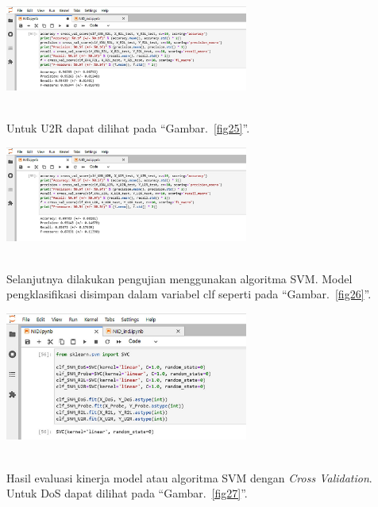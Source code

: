 \documentclass[conference]{IEEEtran}
\begin{document}
\begin{minipage}{\linewidth}
\centerline{\includegraphics[width=80mm]{Gambar/Gbr23.jpg}}
\label{fig24}
\end{minipage}\\

\noindent Untuk U2R dapat dilihat pada ``Gambar.~\ref{fig25}''.\\

\begin{minipage}{\linewidth}
\centerline{\includegraphics[width=80mm]{Gambar/Gbr24.jpg}}
\label{fig25}
\end{minipage}\\

Selanjutnya dilakukan pengujian menggunakan algoritma SVM. Model pengklasifikasi disimpan dalam variabel clf seperti pada ``Gambar.~\ref{fig26}''.\\

\begin{minipage}{\linewidth}
\centerline{\includegraphics[width=80mm]{Gambar/Gbr25.jpg}}
\label{fig26}
\end{minipage}\\

Hasil evaluasi kinerja model atau algoritma SVM dengan \emph{Cross Validation}.\\
Untuk DoS dapat dilihat pada ``Gambar.~\ref{fig27}''.\\
\end{document}
